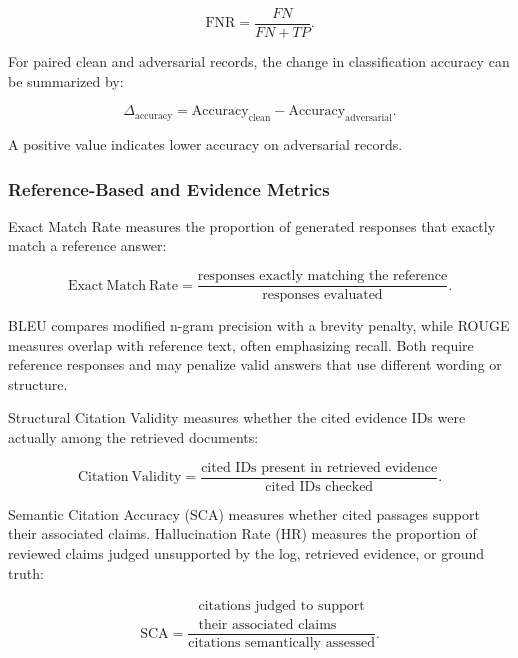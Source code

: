 \begin{equation}
\mathrm{FNR} = \frac{FN}{FN+TP}.
\end{equation}

For paired clean and adversarial records, the change in classification
accuracy can be summarized by:

\begin{equation}
\Delta_{\mathrm{accuracy}} =
\mathrm{Accuracy}_{\mathrm{clean}} -
\mathrm{Accuracy}_{\mathrm{adversarial}}.
\end{equation}

A positive value indicates lower accuracy on adversarial records.

\subsubsection{Reference-Based and Evidence Metrics}

Exact Match Rate measures the proportion of generated responses that
exactly match a reference answer:

\begin{equation}
\mathrm{Exact\ Match\ Rate} =
\frac{\text{responses exactly matching the reference}}
{\text{responses evaluated}}.
\end{equation}

BLEU compares modified n-gram precision with a brevity penalty, while
ROUGE measures overlap with reference text, often emphasizing recall.
Both require reference responses and may penalize valid answers that use
different wording or structure.

Structural Citation Validity measures whether the cited evidence IDs
were actually among the retrieved documents:

\begin{equation}
\mathrm{Citation\ Validity} =
\frac{\text{cited IDs present in retrieved evidence}}
{\text{cited IDs checked}}.
\end{equation}

Semantic Citation Accuracy (SCA) measures whether cited passages support
their associated claims. Hallucination Rate (HR) measures the proportion
of reviewed claims judged unsupported by the log, retrieved evidence, or
ground truth:

\begin{equation}
\mathrm{SCA} =
\frac{\substack{\text{citations judged to support}\\
\text{their associated claims}}}
{\text{citations semantically assessed}}.
\end{equation}

